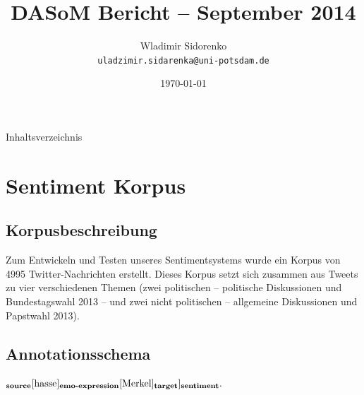 \documentclass{beamer}
\title[Bericht 2014]{DASoM Bericht -- September 2014}
\author[Sidorenko]{Wladimir Sidorenko\\ \texttt{uladzimir.sidarenka{@}uni-potsdam.de}}
\institute[Uni Potsdam]{University of Potsdam}
\date{\today}
\begin{document}
    \begin{frame}{}
      \titlepage
    \end{frame}

    \begin{frame}{Inhaltsverzeichnis}
      \tableofcontents
    \end{frame}

    \section{Sentiment Korpus}
    \subsection{Korpusbeschreibung}
    \begin{frame}{\insertsubsection}
      Zum Entwickeln und Testen unseres Sentimentsystems wurde ein Korpus von
      4995 Twitter-Nachrichten erstellt.  Dieses Korpus setzt sich zusammen
      aus Tweets zu vier verschiedenen Themen (zwei politischen -- politische
      Diskussionen und Bundestagswahl 2013 -- und zwei nicht politischen --
      allgemeine Diskussionen und Papstwahl 2013).
    \end{frame}

    \subsection{Annotationsschema}
    \begin{frame}{\insertsubsection}
      \begin{example}
        \begin{math}
        [[\text{Ich}]_{\text{\bfseries source}}
          [\text{hasse}]_{\text{\bfseries emo-expression}}
          [\text{Merkel}]_{\text{\bfseries target}}]_{\text{\bfseries sentiment}}\text{.}
        \end{math}
      \end{example}
    \end{frame}
\end{document}
